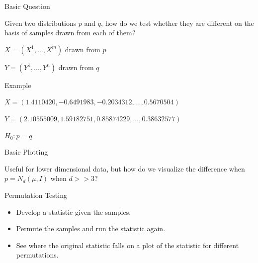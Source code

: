 \documentclass{beamer}
\newcommand{\bi}{\begin{itemize}}
\newcommand{\ei}{\end{itemize}}
\begin{document}
%
%


\begin{frame}{Basic Question}

Given two distributions $p$ and $q$, how do we test whether they are different on the basis of samples drawn from each of them?

\begin{center}
$X = (X^1, ... , X^m)$ drawn from $p$

\vspace{.2 cm}

$Y = (Y^1, ..., Y^n)$ drawn from $q$
\end{center}


\end{frame}

\begin{frame}
{Example}

$X = (1.4110420, -0.6491983, -0.2034312,  ...,  0.5670504)$

\vspace{.2 cm}
$Y = ( 2.10555009,  1.59182751,  0.85874229, ...,  0.38632577)$

\pause 

\vspace{1cm}
\begin{center}
$H_0: p = q$

\end{center}
\end{frame}


\begin{frame}{Basic Plotting}

Useful for lower dimensional data, but how do we visualize the difference when $p = N_d(\mu, I)$ when $d >> 3$?

\end{frame}


\begin{frame}{Permutation Testing}

\bi 
\item Develop a statistic given the samples.

\item Permute the samples and run the statistic again.

\item See where the original statistic falls on a plot of the statistic for different permutations. 
\ei 

\end{frame}
\end{document}
